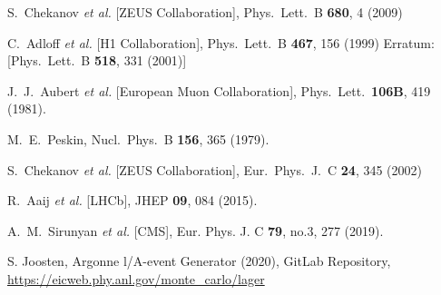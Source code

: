 \documentclass[10pt,prd,aps,nofootinbib,superscriptaddress]{revtex4}
\begin{document}
\begin{thebibliography}{99}
  S.~Chekanov {\it et al.} [ZEUS Collaboration],
  Phys.\ Lett.\ B {\bf 680}, 4 (2009)
 

  C.~Adloff {\it et al.} [H1 Collaboration],
  Phys.\ Lett.\ B {\bf 467}, 156 (1999)
  Erratum: [Phys.\ Lett.\ B {\bf 518}, 331 (2001)]
 

  J.~J.~Aubert {\it et al.} [European Muon Collaboration],
  Phys.\ Lett.\  {\bf 106B}, 419 (1981).
 
  M.~E.~Peskin,
  Nucl.\ Phys.\ B {\bf 156}, 365 (1979).


  S.~Chekanov {\it et al.} [ZEUS Collaboration],
  Eur.\ Phys.\ J.\ C \textbf{24}, 345 (2002)


R.~Aaij {\it et al.} [LHCb],
JHEP \textbf{09}, 084 (2015). 


A.~M.~Sirunyan {\it et al.} [CMS],
Eur. Phys. J. C \textbf{79}, no.3, 277 (2019). 

S. Joosten, Argonne l/A-event Generator (2020), GitLab Repository,
\url{https://eicweb.phy.anl.gov/monte_carlo/lager}


\end{thebibliography}
\end{document}
